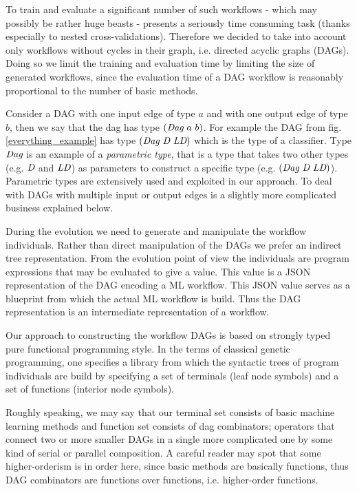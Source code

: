 \documentclass{ws-ijait}
\begin{document}
To train and evaluate a significant number of such workflows - which may possibly be rather huge beasts -  presents a seriously time consuming task (thanks especially to nested cross-validations). Therefore we decided to take into account only workflows without cycles in their graph, i.e. directed acyclic graphs (DAGs). Doing so we limit the training and evaluation time by limiting the size of generated workflows, since the evaluation time of a DAG workflow is reasonably proportional to the number of basic methods.

Consider a DAG with one input edge of type $a$ and with one output edge of type $b$, then we say that the dag has type $(\textit{Dag}\ a\ b)$. 
For example the DAG from fig. \ref{everything_example} has type $(\textit{Dag}\ \textit{D}\ \textit{LD})$ which is the type of a classifier.
Type $\textit{Dag}$ is an example of a \textit{parametric type}, that is a type that takes two other types (e.g. $\textit{D}$ and $\textit{LD}$) as parameters to construct a specific type (e.g. $(\textit{Dag}\ \textit{D}\ \textit{LD})$).
Parametric types are extensively used and exploited in our approach.
To deal with DAGs with multiple input or output edges is a slightly more complicated business explained below.


During the evolution we need to generate and manipulate the workflow individuals. Rather than direct manipulation of the DAGs we prefer an indirect tree representation. From the evolution point of view the individuals are program expressions that may be  evaluated to give a value. This value is a JSON representation of the DAG encoding a ML workflow. This JSON value serves as a blueprint from which the actual ML workflow is build. Thus the DAG representation is an intermediate representation of a workflow.

Our approach to constructing the workflow DAGs is based on strongly typed pure functional programming style. In the terms of classical genetic programming, one specifies a library from which the syntactic trees of program individuals are build by specifying a set of terminals (leaf node symbols) and a set of functions (interior node symbols). 

Roughly speaking, we may say that our terminal set consists of basic machine learning methods and function set consists of dag combinators; operators that connect two or more smaller DAGs in a single more complicated one by some kind of serial or parallel composition. A careful reader may spot that some higher-orderism is in order here, since basic methods are basically functions, thus DAG combinators are functions over functions, i.e. higher-order functions.
\end{document}
